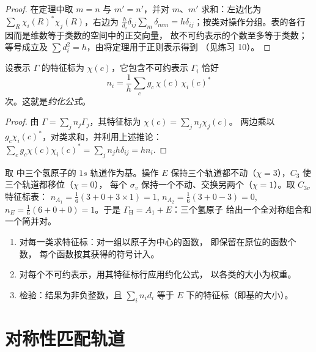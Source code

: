 \begin{proof}
在定理中取 $m = n$ 与 $m' = n'$，并对 $m$、$m'$ 求和：左边化为
$\sum_R\chi_i(R)^*\chi_j(R)$，右边为 $\frac{h}{d_i}\delta_{ij}
\sum_{m}\delta_{mm} = h\delta_{ij}$；按类对操作分组。表的各行
因而是维数等于类数的空间中的正交向量，
故不可约表示的个数至多等于类数；
等号成立及 $\sum d_i^2 = h$，由将定理用于正则表示得到
（见练习 10）。
\end{proof}

\begin{theorem}[约化公式]\label{thm:b3:group-theory-applied:reduction}
设表示 $\Gamma$ 的特征标为 $\chi(c)$，它包含不可约表示
$\Gamma_i$ 恰好
\[
n_i = \frac1h\sum_cg_c\,\chi(c)\,\chi_i(c)^*
\]
次。这就是\emph{约化公式}。
\end{theorem}

\begin{proof}
由 $\Gamma = \sum_jn_j\Gamma_j$，其特征标为 $\chi(c) = \sum_jn_j\chi_j(c)$。
两边乘以 $g_c\chi_i(c)^*$，对类求和，并利用上述推论：
$\sum_cg_c\chi(c)\chi_i(c)^* = \sum_jn_jh\delta_{ij} = hn_i$.
\end{proof}

\begin{example}[氨的氢原子轨道]\label{ex:b3:group-theory-applied:nh3}
取  中三个氢原子的 $1s$ 轨道作为基。操作 $E$
保持三个轨道都不动（$\chi = 3$），$C_3$ 使三个轨道都移位（$\chi = 0$），
每个 $\sigma_v$ 保持一个不动、交换另两个（$\chi = 1$）。取 $C_{3v}$ 特征标表：
$n_{A_1} = \frac16(3 + 0 + 3\times1) = 1$, $n_{A_2} = \frac16(3 + 0 - 3) = 0$,
$n_E = \frac16(6 + 0 + 0) = 1$。于是 $\Gamma_{\mathrm H} = A_1 + E$：三个氢原子
给出一个全对称组合和一个简并对。
\end{example}

\begin{method}[约化表示]\label{met:b3:group-theory-applied:reduce}
\begin{enumerate}
  \item 对每一类求特征标：对一组以原子为中心的函数，
        即保留在原位的函数个数，
        每个函数按其获得的符号计入。
  \item 对每个不可约表示，用其特征标行应用约化公式，
        以各类的大小为权重。
  \item 检验：结果为非负整数，且 $\sum_in_id_i$
        等于 $E$ 下的特征标（即基的大小）。
\end{enumerate}
\end{method}

\section{对称性匹配轨道}

